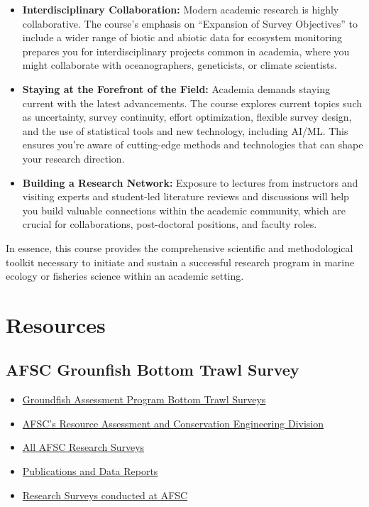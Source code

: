 \documentclass[
  letterpaper,
  oneside,
  open=any]{scrbook}
\providecommand{\tightlist}{%
  \setlength{\itemsep}{0pt}\setlength{\parskip}{0pt}}\usepackage{longtable,booktabs,array}
\begin{document}
\begin{itemize}
\item
  \textbf{Interdisciplinary Collaboration:} Modern academic research is
  highly collaborative. The course's emphasis on ``Expansion of Survey
  Objectives'' to include a wider range of biotic and abiotic data for
  ecosystem monitoring prepares you for interdisciplinary projects
  common in academia, where you might collaborate with oceanographers,
  geneticists, or climate scientists.
\item
  \textbf{Staying at the Forefront of the Field:} Academia demands
  staying current with the latest advancements. The course explores
  current topics such as uncertainty, survey continuity, effort
  optimization, flexible survey design, and the use of statistical tools
  and new technology, including AI/ML. This ensures you're aware of
  cutting-edge methods and technologies that can shape your research
  direction.
\item
  \textbf{Building a Research Network:} Exposure to lectures from
  instructors and visiting experts and student-led literature reviews
  and discussions will help you build valuable connections within the
  academic community, which are crucial for collaborations,
  post-doctoral positions, and faculty roles.
\end{itemize}

In essence, this course provides the comprehensive scientific and
methodological toolkit necessary to initiate and sustain a successful
research program in marine ecology or fisheries science within an
academic setting.


\chapter{Resources}\label{resources}

\section{AFSC Grounfish Bottom Trawl
Survey}\label{afsc-grounfish-bottom-trawl-survey}

\begin{itemize}
\tightlist
\item
  \href{https://www.fisheries.noaa.gov/alaska/science-data/groundfish-assessment-program-bottom-trawl-surveys}{Groundfish
  Assessment Program Bottom Trawl Surveys}
\item
  \href{https://www.fisheries.noaa.gov/about/resource-assessment-and-conservation-engineering-division}{AFSC's
  Resource Assessment and Conservation Engineering Division}
\item
  \href{https://www.fisheries.noaa.gov/alaska/ecosystems/alaska-fish-research-surveys}{All
  AFSC Research Surveys}
\item
  \href{https://repository.library.noaa.gov/}{Publications and Data
  Reports}
\item
  \href{https://www.fisheries.noaa.gov/alaska/ecosystems/alaska-fish-research-surveys}{Research
  Surveys conducted at AFSC}
\end{itemize}
\end{document}
